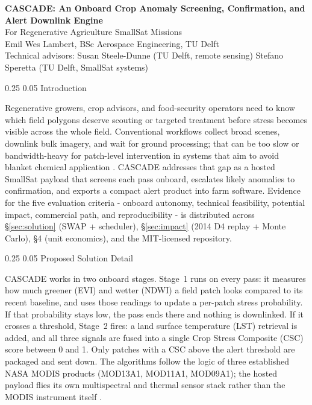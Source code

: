\documentclass[11pt,letterpaper]{article}
\makeatletter
\renewcommand\section{\@startsection{section}{1}{\z@}
  {0.25\baselineskip}
  {0.05\baselineskip}
  {\normalfont\large\bfseries}}
\makeatother
\begin{document}
\thispagestyle{fancy}

\begin{center}
{\LARGE\bfseries CASCADE: An Onboard Crop Anomaly Screening, Confirmation, and Alert Downlink Engine}\\[2pt]
{\large For Regenerative Agriculture SmallSat Missions}\\[3pt]
Emil Wes Lambert, BSc Aerospace Engineering, TU Delft \\
\smallskip
{\small Technical advisors: Susan Steele-Dunne (TU Delft, remote sensing) \quad Stefano Speretta (TU Delft, SmallSat systems)} \\
\end{center}

\section{Introduction}

Regenerative growers, crop advisors, and food-security operators need to know which field polygons deserve scouting or targeted treatment before stress becomes visible across the whole field. Conventional workflows collect broad scenes, downlink bulk imagery, and wait for ground processing; that can be too slow or bandwidth-heavy for patch-level intervention in systems that aim to avoid blanket chemical application \cite{nasa-challenge-brief,gold-cida-seminar}. CASCADE addresses that gap as a hosted SmallSat payload that screens each pass onboard, escalates likely anomalies to confirmation, and exports a compact alert product into farm software. Evidence for the five evaluation criteria - onboard autonomy, technical feasibility, potential impact, commercial path, and reproducibility - is distributed across \S\ref{sec:solution} (SWAP + scheduler), \S\ref{sec:impact} (2014 D4 replay + Monte Carlo), \S4 (unit economics), and the MIT-licensed repository.

\section{Proposed Solution Detail}
\label{sec:solution}

CASCADE works in two onboard stages. Stage~1 runs on every pass: it measures how much greener (EVI) and wetter (NDWI) a field patch looks compared to its recent baseline, and uses those readings to update a per-patch stress probability. If that probability stays low, the pass ends there and nothing is downlinked. If it crosses a threshold, Stage~2 fires: a land surface temperature (LST) retrieval is added, and all three signals are fused into a single Crop Stress Composite (CSC) score between 0 and 1. Only patches with a CSC above the alert threshold are packaged and sent down. The algorithms follow the logic of three established NASA MODIS products (MOD13A1, MOD11A1, MOD09A1); the hosted payload flies its own multispectral and thermal sensor stack rather than the MODIS instrument itself \cite{mod13a1,mod11a1,mod09a1,mod09-guide}.
\end{document}
